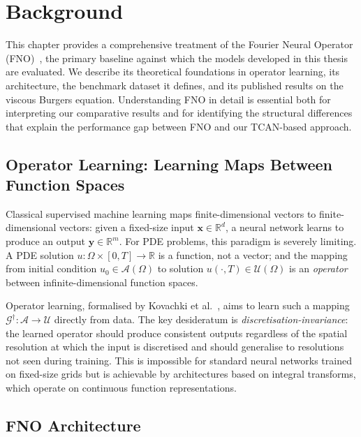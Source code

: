 \usetikzlibrary{positioning,arrows.meta}
\chapter{Background}
\label{chap:fno}

This chapter provides a comprehensive treatment of the Fourier Neural Operator (FNO)~\cite{li2021fourier}, the primary baseline against which the models developed in this thesis are evaluated. We describe its theoretical foundations in operator learning, its architecture, the benchmark dataset it defines, and its published results on the viscous Burgers equation. Understanding FNO in detail is essential both for interpreting our comparative results and for identifying the structural differences that explain the performance gap between FNO and our TCAN-based approach.

\section{Operator Learning: Learning Maps Between Function Spaces}
\label{sec:fno:operator-learning}

Classical supervised machine learning maps finite-dimensional vectors to finite-dimensional vectors: given a fixed-size input $\mathbf{x} \in \mathbb{R}^d$, a neural network learns to produce an output $\mathbf{y} \in \mathbb{R}^m$. For PDE problems, this paradigm is severely limiting. A PDE solution $u : \Omega \times [0,T] \to \mathbb{R}$ is a function, not a vector; and the mapping from initial condition $u_0 \in \mathcal{A}(\Omega)$ to solution $u(\cdot, T) \in \mathcal{U}(\Omega)$ is an \emph{operator} between infinite-dimensional function spaces.

Operator learning, formalised by Kovachki et al.~\cite{kovachki2023neural}, aims to learn such a mapping $\mathcal{G}^\dagger : \mathcal{A} \to \mathcal{U}$ directly from data. The key desideratum is \emph{discretisation-invariance}: the learned operator should produce consistent outputs regardless of the spatial resolution at which the input is discretised and should generalise to resolutions not seen during training. This is impossible for standard neural networks trained on fixed-size grids but is achievable by architectures based on integral transforms, which operate on continuous function representations.

\section{FNO Architecture}
\label{sec:fno:architecture}

